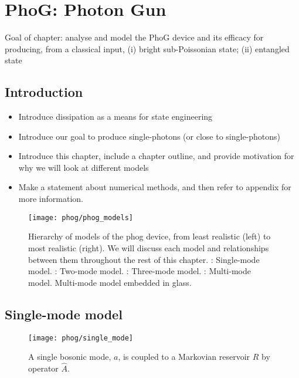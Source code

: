 %
%
%
%
%

\chapter{PhoG: Photon Gun}\label{chapter:phog}
Goal of chapter: analyse and model the PhoG device and its efficacy for producing, from a classical input, (i) bright sub-Poissonian state; (ii) entangled state


\section{Introduction}
\begin{itemize}
\item Introduce dissipation as a means for state engineering
\item Introduce our goal to produce single-photons (or close to single-photons)
\item Introduce this chapter, include a chapter outline, and provide motivation for why we will look at different models
\item Make a statement about numerical methods, and then refer to appendix for more information.
\end{itemize}

\begin{figure}[htp]
\centering
\texttt{[image: phog/phog\_models]}
\caption{\label{fig:phog_models} Hierarchy of models of the phog device, from least realistic (left) to most realistic (right). We will discuss each model and relationships between them throughout the rest of this chapter. \MakeUppercase{}: Single-mode model. \MakeUppercase{}: Two-mode model. \MakeUppercase{}: Three-mode model. \MakeUppercase{}: Multi-mode model. \MakeUppercase{} Multi-mode model embedded in glass. }
\end{figure}

\section{Single-mode model}\label{sec:phog_single_mode_model}

\begin{figure}[htp]
\centering
\texttt{[image: phog/single\_mode]}
\caption{\label{fig:phog_single_mode} A single bosonic mode, $a$, is coupled to a Markovian reservoir $R$ by operator $\hat{A}$. }
\end{figure}

